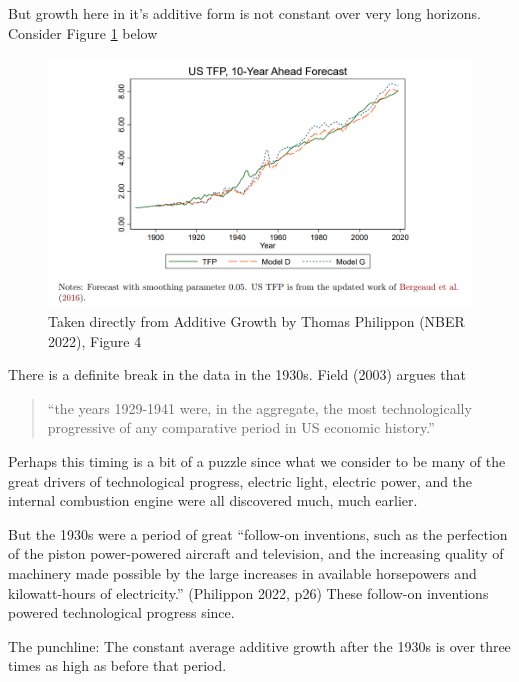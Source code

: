 \documentclass[
]{book}
\begin{document}
But growth here in it's additive form is not constant over very long horizons. Consider Figure \ref{fig:philipponfig4} below

\begin{figure}

{\centering \includegraphics[width=1\linewidth]{img/growth2/philipponfig4} 

}

\caption{Taken directly from Additive Growth by Thomas Philippon (NBER 2022), Figure 4}\label{fig:philipponfig4}
\end{figure}

There is a definite break in the data in the 1930s. Field (2003) argues that

\begin{quote}
``the years 1929-1941 were, in the aggregate, the most technologically progressive of any comparative period in US economic history.''
\end{quote}

Perhaps this timing is a bit of a puzzle since what we consider to be many of the great drivers of technological progress, electric light, electric power, and the internal combustion engine were all discovered much, much earlier.

But the 1930s were a period of great ``follow-on inventions, such as the perfection of the piston power-powered aircraft and television, and the increasing quality of machinery made possible by the large increases in available horsepowers and kilowatt-hours of electricity.'' (Philippon 2022, p26) These follow-on inventions powered technological progress since.

The punchline: The constant average additive growth after the 1930s is over three times as high as before that period.
\end{document}
